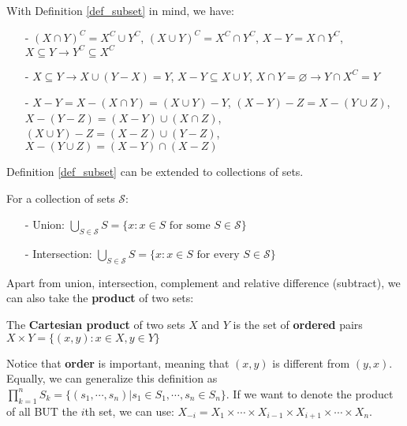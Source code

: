 With Definition \ref{def_subset} in mind, we have:
\begin{enumerate}
    \item[-] $(X\cap Y)^C = X^C\cup Y^C$, $(X\cup Y)^C = X^C\cap Y^C$, $X-Y = X\cap Y^C$, $X\subseteq Y \rightarrow Y^C \subseteq X^C$
    \item[-] $X\subseteq Y \rightarrow X\cup(Y-X)=Y$, $X-Y \subseteq X\cup Y$, $X\cap Y =\varnothing\rightarrow Y\cap X^C=Y$
    \item[-] $X-Y = X-(X\cap Y)=(X\cup Y)-Y$, $(X-Y)-Z=X-(Y\cup Z)$, $X-(Y-Z) = (X-Y)\cup(X\cap Z)$, $(X\cup Y)-Z = (X-Z)\cup(Y-Z)$, $X-(Y\cup Z)=(X-Y)\cap(X-Z)$
\end{enumerate}

Definition \ref{def_subset} can be extended to collections of sets.
\begin{definition}
For a collection of sets $\mathcal{S}$:
\begin{enumerate}
    \item[-] Union: $\bigcup_{S\in\mathcal{S}}S=\{x:x\in S \text{ for some } S\in \mathcal{S}\}$
    \item[-] Intersection: $\bigcup_{S\in\mathcal{S}}S=\{x:x\in S \text{ for every } S\in \mathcal{S}\}$
\end{enumerate}
\end{definition}

Apart from union, intersection, complement and relative difference (subtract), we can also take the \textbf{product} of two sets:
\begin{definition}\label{def_cartesian_product}
    The \textbf{Cartesian product} of two sets $X$ and $Y$ is the set of \textbf{ordered} pairs $X\times Y = \{(x,y):x\in X, y\in Y\}$
\end{definition}
Notice that \textbf{order} is important, meaning that $(x,y)$ is different from $(y,x)$. Equally, we can generalize this definition as 
$\prod^n_{k=1}S_k=\{(s_1,\cdots,s_n)|s_1\in S_1,\cdots,s_n\in S_n\}$. If we want to denote the product of all BUT the $i$th set, we can use:
$X_{-i}=X_1\times \cdots \times X_{i-1}\times X_{i+1}\times\cdots\times X_n$.

